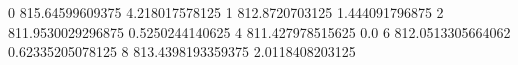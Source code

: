 0 815.64599609375 4.218017578125
1 812.8720703125 1.444091796875
2 811.9530029296875 0.5250244140625
4 811.427978515625 0.0
6 812.0513305664062 0.62335205078125
8 813.4398193359375 2.0118408203125
